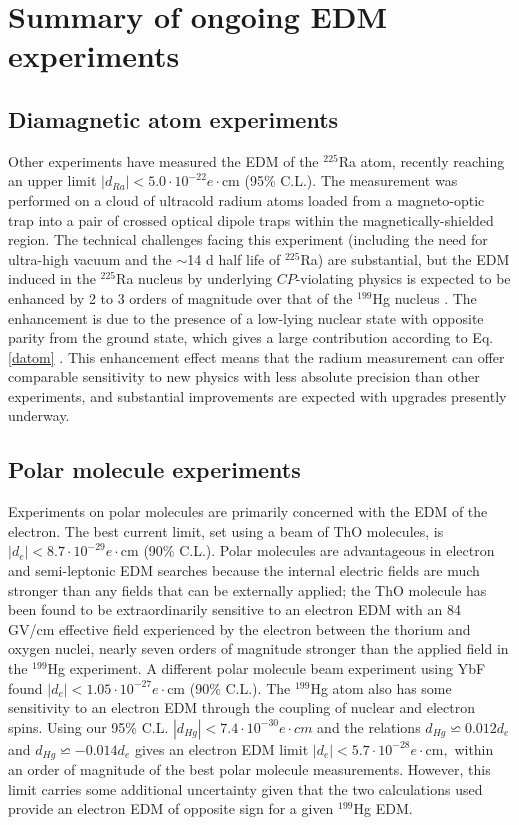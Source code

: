 \documentclass [10pt, twoside] {uwthesis}[2012/04/02]
\begin{document}
\section{Summary of ongoing EDM experiments}
\subsection{Diamagnetic atom experiments} %
Other experiments have measured the EDM of the $^{225}${R}a atom, recently reaching an upper limit $|d_{Ra}| < 5.0\cdot 10^{-22} e\cdot \text{cm}$ (95\% C.L.)\cite{2015_Ra_EDM}. The measurement was performed on a cloud of ultracold radium atoms loaded from a magneto-optic trap into a pair of crossed optical dipole traps within the magnetically-shielded region. The technical challenges facing this experiment (including the need for ultra-high vacuum and the $\sim$14 d half life of $^{225}${R}a) are substantial, but the EDM induced in the $^{225}${R}a nucleus by underlying $CP$-violating physics is expected to be enhanced by 2 to 3 orders of magnitude over that of the $^{199}${H}g nucleus \cite{1997_Spevak_et._al._EDM_enhancement}. The enhancement is due to the presence of a low-lying nuclear state with opposite parity from the ground state, which gives a large contribution according to Eq. \ref{datom} \cite{2013_Engel_et_al_EDM_review}. This enhancement effect means that the radium measurement can offer comparable sensitivity to new physics with less absolute precision than other experiments, and substantial improvements are expected with upgrades presently underway.

\subsection{Polar molecule experiments} %
Experiments on polar molecules are primarily concerned with the EDM of the electron. The best current limit, set using a beam of ThO molecules, is $|d_{e}| < 8.7\cdot 10^{-29} e\cdot \text{cm}$ (90\% C.L.)\cite{2014_ACME_eEDM}. Polar molecules are advantageous in electron and semi-leptonic EDM searches because the internal electric fields are much stronger than any fields that can be externally applied; the ThO molecule has been found to be extraordinarily sensitive to an electron EDM with an 84 GV/cm effective field experienced by the electron between the thorium and oxygen nuclei, nearly seven orders of magnitude stronger than the applied field in the $^{199}$Hg experiment. A different polar molecule beam experiment using YbF found $|d_{e}| < 1.05\cdot 10^{-27} e \cdot \text{cm}$ (90\% C.L.)\cite{2011_YbF_EDM}. The $^{199}$Hg atom also has some sensitivity to an electron EDM through the coupling of nuclear and electron spins. Using our 95\% C.L. $|d_{Hg}| < 7.4\cdot 10^{-30} e\cdot cm$ and the relations $d_{Hg}\backsimeq 0.012 d_{e}$ \cite{1987_Martensson_Oster_eEDM} and $d_{Hg}\backsimeq -0.014 d_{e}$ \cite{1985_Flambaum_Khriplovich_eEDM_bound} gives an electron EDM limit $|d_{e}| < 5.7\cdot 10^{-28} e\cdot \text{cm},$ within an order of magnitude of the best polar molecule measurements. However, this limit carries some additional uncertainty given that the two calculations used provide an electron EDM of opposite sign for a given $^{199}$Hg EDM. 
\end{document}
